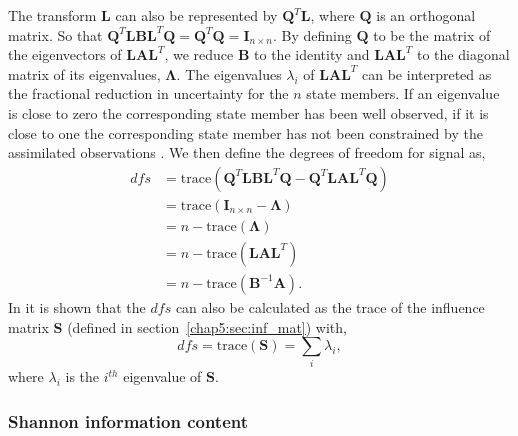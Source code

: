 The transform $\textbf{L}$ can also be represented by $\textbf{Q}^{T}\textbf{L}$, where $\textbf{Q}$ is an orthogonal matrix. So that $\textbf{Q}^{T}\textbf{L}\textbf{B}\textbf{L}^{T}\textbf{Q} = \textbf{Q}^{T}\textbf{Q} = \textbf{I}_{n \times n}$. By defining $\textbf{Q}$ to be the matrix of the eigenvectors of $\textbf{L}\textbf{A}\textbf{L}^{T}$, we reduce $\textbf{B}$ to the identity and $\textbf{L}\textbf{A}\textbf{L}^{T}$ to the diagonal matrix of its eigenvalues, $\bm{\Lambda}$. The eigenvalues $\lambda_{i}$ of $\textbf{L}\textbf{A}\textbf{L}^{T}$ can be interpreted as the fractional reduction in uncertainty for the $n$ state members. If an eigenvalue is close to zero the corresponding state member has been well observed, if it is close to one the corresponding state member has not been constrained by the assimilated observations \citep{stewart2008correlated}. We then define the degrees of freedom for signal as,
\begin{equation}
\begin{split}
dfs & = \text{trace}(\textbf{Q}^{T}\textbf{L}\textbf{B}\textbf{L}^{T}\textbf{Q} - \textbf{Q}^{T}\textbf{L}\textbf{A}\textbf{L}^{T}\textbf{Q}) \\
       & = \text{trace}(\mathbf{I}_{n\times n} - \bm{\Lambda}) \\
       & = n - \text{trace}(\bm{\Lambda}) \\
       & = n - \text{trace}(\textbf{L}\textbf{A}\textbf{L}^{T}) \\
       & = n - \text{trace}(\mathbf{B}^{-1}\mathbf{A}). \label{chap5:eqn:dfs}
\end{split}
\end{equation}
In \citet{rodgers2000inverse} it is shown that the $dfs$ can also be calculated as the trace of the influence matrix $\textbf{S}$ (defined in section~\ref{chap5:sec:inf_mat}) with,
\begin{equation}
dfs = \text{trace}(\textbf{S}) = \sum_{i} \lambda_{i},
\end{equation}
where $\lambda_{i}$ is the $i^{th}$ eigenvalue of $\textbf{S}$.

\subsubsection{Shannon information content}%

